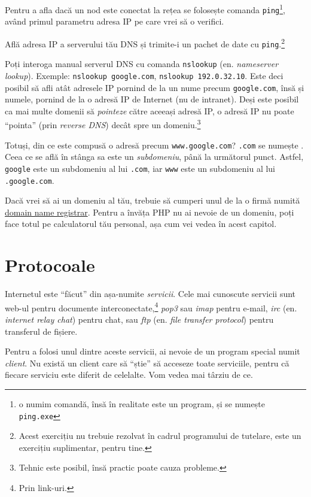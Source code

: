 Pentru a afla dacă un nod este conectat la rețea se folosește comanda
\texttt{ping}\footnote{o numim comandă, însă în realitate este un program,
și se numește \texttt{ping.exe}}, având primul
parametru adresa IP pe care vrei să o verifici.

\begin{Exercise}[title={Ping your DNS server}]
Află adresa IP a serverului tău DNS și trimite-i un pachet de date cu \texttt{ping}.\footnote{Acest exercițiu nu trebuie
rezolvat în cadrul programului de tutelare, este un exercițiu suplimentar,
pentru tine.}
\end{Exercise}

Poți interoga manual serverul DNS cu comanda \texttt{nslookup}
(en. \textsl{nameserver lookup}). Exemple:
\texttt{nslookup google.com}, \texttt{nslookup 192.0.32.10}.
Este deci posibil să afli atât adresele IP pornind de la un nume precum
\texttt{google.com}, însă și numele, pornind de la o adresă IP de Internet
(nu de intranet).
Deși este posibil ca mai multe domenii să \textsl{pointeze} către aceeași
adresă IP, o adresă IP nu poate ``pointa'' (prin \textsl{reverse DNS})
decât spre un domeniu.\footnote{Tehnic este posibil, însă practic poate
cauza probleme.}

Totuși, din ce este compusă o adresă precum \texttt{www.google.com}?
\texttt{.com} se numește . Ceea ce se află în stânga
sa este un \textsl{subdomeniu}, până la următorul punct.
Astfel, \texttt{google} este un subdomeniu al lui \texttt{.com},
iar \texttt{www} este un subdomeniu al lui \texttt{.google.com}.

Dacă vrei să ai un domeniu al tău, trebuie să cumperi unul de la
o firmă numită \href{http://en.wikipedia.org/wiki/Domain_name_registrar}{domain name
registrar}. Pentru a învăța PHP nu ai nevoie de un domeniu, poți
face totul pe calculatorul tău personal, așa cum vei vedea în acest capitol.

\section{Protocoale}
Internetul este ``făcut'' din așa-numite \textsl{servicii}. Cele mai cunoscute servicii sunt
web-ul pentru documente interconectate,\footnote{Prin link-uri.}
\textsl{pop3} sau \textsl{imap} pentru e-mail,
\textsl{irc} (en. \textsl{internet relay chat}) pentru chat, sau
\textsl{ftp} (en. \textsl{file transfer protocol}) pentru transferul de fișiere.

Pentru a folosi unul dintre aceste servicii, ai nevoie de un program
special numit \textsl{client}. Nu există un client care să ``știe'' 
să acceseze toate serviciile, pentru
că fiecare serviciu este diferit de celelalte. Vom vedea mai târziu de ce.


